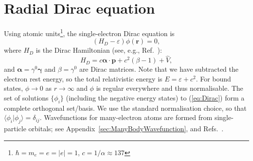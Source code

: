 \documentclass[10pt,twocolumn,a4paper]{article}%
\newcommand{\braket}[1]{\ensuremath{\langle #1\rangle}}	%
\renewcommand{\v}[1]{\ensuremath{\boldsymbol{#1}}}		%
\newcommand{\be}{\begin{equation}}
\newcommand{\ee}{\end{equation}}
\def\h{\ensuremath{\hbar}}
\def\en{\ensuremath{\varepsilon}}
\renewcommand{\b}{\ensuremath{\beta}}
\newcommand{\g}{\ensuremath{\gamma}}
\begin{document}


{\footnotesize
\tableofcontents
}

\section{Radial Dirac equation}


Using atomic units\footnote{$\h=m_e=e=|e|=1$, $c=1/\alpha\approx137$}, the single-electron Dirac equation is
\be\label{eq:Dirac}
\left(H_D - \en\right) \phi(\v{r}) = 0,
\ee
where $H_D$ is the Dirac Hamiltonian (see, e.g., Ref.~\cite{BetheBook}):
\be\label{eq:H-Dirac}
H_D = c \v{\alpha}\cdot\v{p} + c^2(\beta-1) + \hat V,
\ee
and $\v{\alpha} = \g^0\v{\g}$ and $\b=\g^0$ are Dirac matrices.
Note that we have subtracted the electron rest energy, so the total relativistic energy is $E = \en + c^2$.
For bound states, $\phi\to0$ as $r\to\infty$ and $\phi$ is regular everywhere and thus normalisable.
The set of solutions $\{\phi_i\}$ (including the negative energy states) to (\ref{eq:Dirac}) form a complete orthogonal set/basis.
We use the standard normalisation choice, so that $\braket{\phi_i|\phi_j} = \delta_{ij}$.
%
Wavefunctions for many-electron atoms are formed from single-particle orbitals; see Appendix~\ref{sec:ManyBodyWavefunction}, and Refs.~\cite{Lindgren1986,JohnsonBook2007}.
\end{document}
